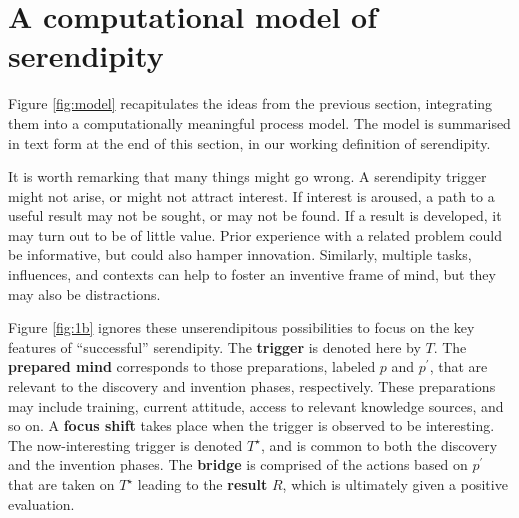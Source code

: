 \section{A computational model of serendipity} \label{sec:our-model}

Figure \ref{fig:model} recapitulates the ideas from the previous
section, integrating them into a computationally meaningful process 
model.  The model is summarised in text form at the end of this
section, in our working definition of serendipity.

It is worth remarking that many things might go wrong.
%
A serendipity trigger might not arise, or might not attract interest.
If interest is aroused, a path to a useful result may not be sought,
or may not be found.  If a result is developed, it may turn out to be
of little value.  Prior experience with a related problem could be
informative, but could also hamper innovation.  Similarly, multiple
tasks, influences, and contexts can help to foster an inventive frame
of mind, but they may also be distractions.

Figure \ref{fig:1b} ignores these unserendipitous possibilities to
focus on the key features of ``successful'' serendipity.
%
The \textbf{trigger} is denoted here by $T$.  
%
The \textbf{prepared mind} corresponds to those preparations, labeled
$p$ and $p^{\prime}$, that are relevant to the discovery and invention
phases, respectively.  These preparations may include training,
current attitude, access to relevant knowledge sources, and so on.
%
A \textbf{focus shift} takes place when the trigger is observed to be
interesting.  The now-interesting trigger is denoted $T^\star$, and is
common to both the discovery and the invention phases.
%
%
The \textbf{bridge} is comprised of the actions based on $p^{\prime}$
that are taken on $T^\star$ leading to the \textbf{result} $R$, which is ultimately given a positive evaluation.

